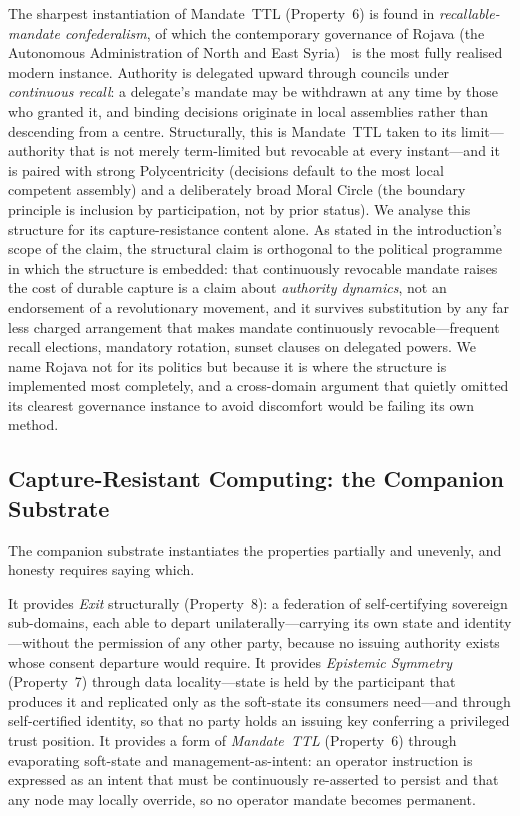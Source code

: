 \documentclass[11pt]{article}
\theoremstyle{definition}
\theoremstyle{plain}
\begin{document}
The sharpest instantiation of Mandate~TTL (Property~6) is found in
\emph{recallable-mandate confederalism}, of which the contemporary governance of
Rojava (the Autonomous Administration of North and East
Syria)~\cite{ocalan2011,knapp2016} is the most fully realised modern instance.
Authority is delegated upward through councils under \emph{continuous recall}:
a delegate's mandate may be withdrawn at any time by those who granted it, and
binding decisions originate in local assemblies rather than descending from a
centre. Structurally, this is Mandate~TTL taken to its limit---authority that is
not merely term-limited but revocable at every instant---and it is paired with
strong Polycentricity (decisions default to the most local competent assembly) and
a deliberately broad Moral Circle (the boundary principle is inclusion by
participation, not by prior status). We analyse this structure for its
capture-resistance content alone. As stated in the introduction's scope of the
claim, the structural claim is orthogonal to the political programme in which the
structure is embedded: that continuously revocable mandate raises the cost of durable capture is
a claim about \emph{authority dynamics}, not an endorsement of a revolutionary
movement, and it survives substitution by any far less charged arrangement that
makes mandate continuously revocable---frequent recall elections, mandatory
rotation, sunset clauses on delegated powers. We name Rojava not for its politics
but because it is where the structure is implemented most completely, and a
cross-domain argument that quietly omitted its clearest governance instance to
avoid discomfort would be failing its own method.

\subsection{Capture-Resistant Computing: the Companion Substrate}

The companion substrate instantiates the properties partially and unevenly, and
honesty requires saying which.

It provides \emph{Exit} structurally (Property~8): a federation of self-certifying
sovereign sub-domains, each able to depart unilaterally---carrying its own state and
identity---without the permission of any other party, because no issuing authority
exists whose consent departure would require. It provides \emph{Epistemic Symmetry}
(Property~7) through data locality---state is held by the participant that produces
it and replicated only as the soft-state its consumers need---and through
self-certified identity, so that no party holds an issuing key conferring a
privileged trust position. It provides a form of \emph{Mandate~TTL} (Property~6)
through evaporating soft-state and management-as-intent: an operator instruction is
expressed as an intent that must be continuously re-asserted to persist and that any
node may locally override, so no operator mandate becomes permanent.
\end{document}
